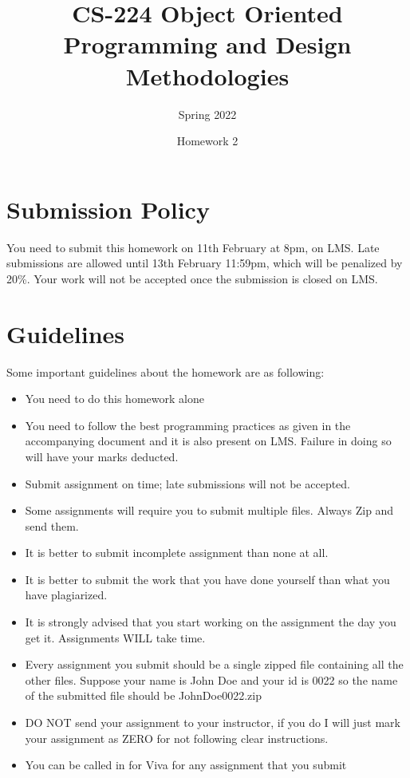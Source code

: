 \documentclass[a4paper,12pt]{article}
\begin{document}
	
	\title{CS-224 Object Oriented Programming and Design Methodologies }
	\author{Spring 2022}
	\date{Homework 2}
	\maketitle
	\section{Submission Policy}
	You need to submit this homework on  {\color{blue}11th February at 8pm}, on LMS. Late submissions are allowed until {\color{red} 13th February 11:59pm}, which will be penalized by 20\%. Your work will not be accepted once the submission is closed on LMS.
	
	\section{Guidelines}
		Some important guidelines about the homework are as following:
	\begin{itemize}
		\item You need to do this homework alone

		\item You need to follow the best programming practices as given in the accompanying document and it is also present on LMS. Failure in doing so will have your marks deducted.
		\item Submit assignment on time; late submissions will not be accepted.
		\item Some assignments will require you to submit multiple files. Always Zip and send them.
		\item It is better to submit incomplete assignment than none at all.
		\item It is better to submit the work that you have done yourself than what you have plagiarized.
		\item It is strongly advised that you start working on the assignment the day you get it. Assignments WILL take time.
		\item Every assignment you submit should be a single zipped file containing all the other files. Suppose your name is John Doe and your id is 0022 so the name of the submitted file should be JohnDoe0022.zip
		\item DO NOT send your assignment to your instructor, if you do I will just mark your assignment as ZERO for not following clear instructions.
		\item You can be called in for Viva for any assignment that you submit
	\end{itemize}
	
\end{document}
